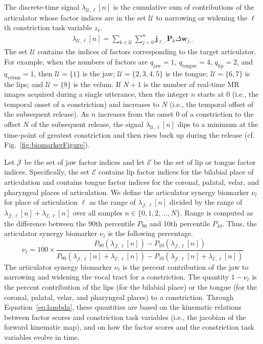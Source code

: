 \documentclass[preprint]{JASAnew}\usepackage[]{graphicx}\usepackage[]{color}
\begin{document}
The discrete-time signal $\lambda_{\mathcal{U},\ell}[n]$ is the cumulative sum of contributions of the articulator whose factor indices are in the set $\mathcal{U}$ to narrowing or widening the $\ell$th constriction task variable $z_\ell$. 
\begin{align}
\label{eq:lambda}
\lambda_{\mathcal{U},\ell} \left[ n \right]
	= \sum_{k\in \mathcal{U}} \sum_{j=0}^{n} \mathbf{j}_{\ell,\cdot} \mathbf{P}_k \Delta \mathbf{w}_{j,\cdot}
\end{align}
The set $\mathcal{U}$ contains the indices of factors corresponding to the target articulator. For example, when the numbers of factors are $q_\text{jaw} = 1$, $q_\text{tongue} = 4$, $q_\text{lip} = 2$, and $q_\text{velum} = 1$, then  $\mathcal{U}=\{1\}$ is the jaw; $\mathcal{U}=\{2,3,4,5\}$ is the tongue; $\mathcal{U}=\{6,7\}$ is the lips; and $\mathcal{U}=\{8\}$ is the velum.
%
If $N+1$ is the number of real-time MR images acquired during a single utterance, then the integer $n$ starts at $0$ (i.e., the temporal onset of a constriction) and increases to $N$ (i.e., the temporal offset of the subsequent release). 
%
As $n$ increases from the onset $0$ of a constriction to the offset $N$ of the subsequent release, the signal $\lambda_{\mathcal{U},\ell}[n]$ dips to a minimum at the time-point of greatest constriction and then rises back up during the release (cf. Fig.~\ref{fig:biomarkerFigure}).



Let $\mathcal{J}$ be the set of jaw factor indices and let $\mathcal{E}$ be the set of lip or tongue factor indices. Specifically, the set $\mathcal{E}$ contains lip factor indices for the bilabial place of articulation and contains tongue factor indices for the coronal, palatal, velar, and pharyngeal places of articulation. 
%
We define the articulator synergy biomarker $\nu_\ell$ for place of articulation $\ell$ as the range of $\lambda_{\mathcal{J},\ell} [ n ]$ divided by the range of $\lambda_{\mathcal{J},\ell} [ n ] + \lambda_{\mathcal{E},\ell} [ n ]$
over all samples $n \in \{0, 1, 2, \ldots, N\}$.
%
Range is computed as the difference between the 90th percentile $P_{90}$ and 10th percentile $P_{10}$. 
%
Thus, the articulator synergy biomarker $\nu_\ell$ is the following percentage.
\begin{equation}
\label{eq:nu}
\nu_\ell
= 
100 \times
\frac{P_{90}\left( \lambda_{\mathcal{J},\ell} [n] \right) - P_{10}\left( \lambda_{\mathcal{J},\ell} [n] \right)}
{P_{90}\left( \lambda_{\mathcal{J},\ell} [n] + \lambda_{\mathcal{E},\ell} [n] \right) - P_{10}\left( \lambda_{\mathcal{J},\ell} [n] + \lambda_{\mathcal{E},\ell} [n]\right)}
\end{equation}
%
The articulator synergy biomarker $\nu_\ell$ is the percent contribution of the jaw to narrowing and widening the vocal tract for a constriction. 
%
The quantity $1-\nu_\ell$ is the percent contribution of the lips (for the bilabial place) or the tongue (for the coronal, palatal, velar, and pharyngeal places) to a constriction. 
%
Through Equation~\ref{eq:lambda}, these quantities are based on the kinematic relations between factor scores and constriction task variables (i.e., the jacobian of the forward kinematic map), and on how the factor scores and the constriction task variables evolve in time.
\end{document}
